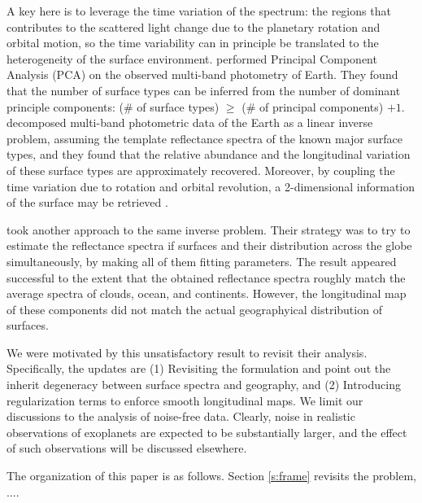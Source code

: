 \documentclass[iop,numberedappendix,apj,]{emulateapj}
\begin{document}
A key here is to leverage the time variation of the spectrum: the regions that contributes to the scattered light change due to the planetary rotation and  orbital motion, so the time variability can in principle be translated to the heterogeneity of the surface environment.  
\citet{Cowan2009, Cowan2011} performed Principal Component Analysis (PCA) on the observed multi-band photometry of Earth. They found that the number of surface types can be inferred from the number of dominant principle components: (\# of surface types) $\ge $ (\# of principal components) $+ 1$. %
\citet{Fujii2010, Fujii2011} decomposed multi-band photometric data of the Earth as a linear inverse problem, assuming the template reflectance spectra of the known major surface types, and they found that the relative abundance and the longitudinal variation of these surface types are approximately recovered. 
Moreover, by coupling the time variation due to rotation and orbital revolution, a 2-dimensional information of the surface may be retrieved \citep{Kawahara2010, Kawahara2011, Fujii2012}. 

\citet{Cowan2013} took another approach to the same inverse problem. 
Their strategy was to try to estimate the reflectance spectra if surfaces and their distribution across the globe simultaneously, by making all of them fitting parameters. 
The result appeared successful to the extent that the obtained reflectance spectra roughly match the average spectra of clouds, ocean, and continents. 
However, the longitudinal map of these components did not match the actual geographyical distribution of surfaces. 

We were motivated by this unsatisfactory result to revisit their analysis. 
Specifically, the updates are (1) Revisiting the formulation and point out the inherit degeneracy between surface spectra and geography, and (2) Introducing regularization terms to enforce smooth longitudinal maps. 
We limit our discussions to the analysis of noise-free data. Clearly, noise in realistic observations of exoplanets are expected to be substantially larger, and the effect of such observations will be discussed elsewhere. 

The organization of this paper is as follows. 
Section \ref{s:frame} revisits the problem, ....

\end{document}
